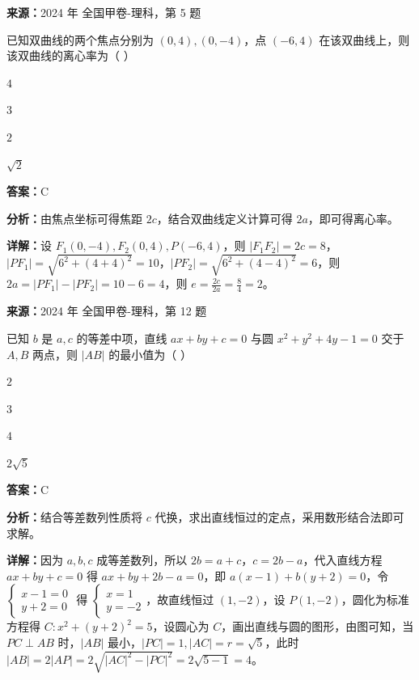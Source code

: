 \begin{question}[points=5]
\textbf{来源：}2024 年 全国甲卷-理科，第 5 题\par
已知双曲线的两个焦点分别为 $(0,4),(0,-4)$，点 $(-6,4)$ 在该双曲线上，则该双曲线的离心率为（   ）
\begin{choices}
  \item $4$
  \item $3$
  \item $2$
  \item $\sqrt{2}$
\end{choices}
\begin{solution}
\textbf{答案：}C

\textbf{分析：}由焦点坐标可得焦距 $2c$，结合双曲线定义计算可得 $2a$，即可得离心率。

\textbf{详解：}设 $F_1(0,-4),F_2(0,4),P(-6,4)$，则 $|F_1F_2|=2c=8$，$|PF_1|=\sqrt{6^2+(4+4)^2}=10$，$|PF_2|=\sqrt{6^2+(4-4)^2}=6$，则 $2a=|PF_1|-|PF_2|=10-6=4$，则 $e=\frac{2c}{2a}=\frac{8}{4}=2$。
\end{solution}
\end{question}

\begin{question}[points=5]
\textbf{来源：}2024 年 全国甲卷-理科，第 12 题\par
已知 $b$ 是 $a,c$ 的等差中项，直线 $ax+by+c=0$ 与圆 $x^2+y^2+4y-1=0$ 交于 $A,B$ 两点，则 $|AB|$ 的最小值为（   ）
\begin{choices}
  \item $2$
  \item $3$
  \item $4$
  \item $2\sqrt{5}$
\end{choices}
\begin{solution}
\textbf{答案：}C

\textbf{分析：}结合等差数列性质将 $c$ 代换，求出直线恒过的定点，采用数形结合法即可求解。

\textbf{详解：}因为 $a,b,c$ 成等差数列，所以 $2b=a+c$，$c=2b-a$，代入直线方程 $ax+by+c=0$ 得 $ax+by+2b-a=0$，即 $a(x-1)+b(y+2)=0$，令 $\begin{cases}x-1=0\\y+2=0\end{cases}$ 得 $\begin{cases}x=1\\y=-2\end{cases}$，故直线恒过 $(1,-2)$，设 $P(1,-2)$，圆化为标准方程得 $C:x^2+(y+2)^2=5$，设圆心为 $C$，画出直线与圆的图形，由图可知，当 $PC\perp AB$ 时，$|AB|$ 最小，$|PC|=1,|AC|=r=\sqrt{5}$，此时 $|AB|=2|AP|=2\sqrt{|AC|^2-|PC|^2}=2\sqrt{5-1}=4$。
\end{solution}
\end{question}

